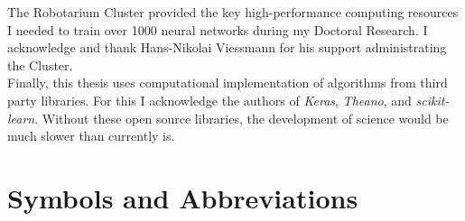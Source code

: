 \documentclass[a4paper, notoc, oneside, openany]{tufte-book} %
\begin{document}
The Robotarium Cluster provided the key high-performance computing resources I needed to train over 1000 neural networks during my Doctoral Research. I acknowledge and thank Hans-Nikolai Viessmann for his support administrating the Cluster.\\

Finally, this thesis uses computational implementation of algorithms from third party libraries. For this I acknowledge the authors of \textit{Keras}, \textit{Theano}, and \textit{scikit-learn}. Without these open source libraries, the development of science would be much slower than currently is.


\pagestyle{mainmatter}
\setcounter{tocdepth}{2}
\tableofcontents %


\listoftables %


\listoffigures %


\chapter{Symbols and Abbreviations}

\end{document}
